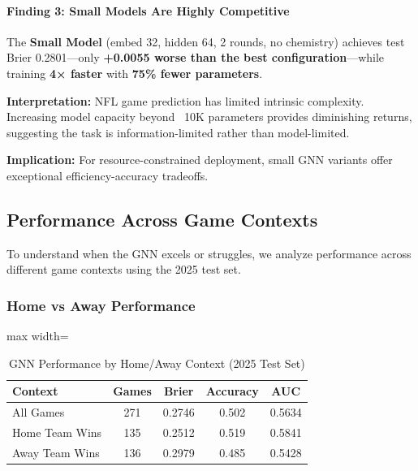 \paragraph{Finding 3: Small Models Are Highly Competitive}

The \textbf{Small Model} (embed 32, hidden 64, 2 rounds, no chemistry) achieves test Brier 0.2801—only \textbf{+0.0055 worse than the best configuration}—while training \textbf{4× faster} with \textbf{75\% fewer parameters}.

\textbf{Interpretation:} NFL game prediction has limited intrinsic complexity. Increasing model capacity beyond ~10K parameters provides diminishing returns, suggesting the task is information-limited rather than model-limited.

\textbf{Implication:} For resource-constrained deployment, small GNN variants offer exceptional efficiency-accuracy tradeoffs.

\subsection{Performance Across Game Contexts}
\label{subsec:gnn_context_analysis}

To understand when the GNN excels or struggles, we analyze performance across different game contexts using the 2025 test set.

\subsubsection{Home vs Away Performance}
\label{subsubsec:gnn_home_away}

\begin{table}[htbp]
\centering
\caption{GNN Performance by Home/Away Context (2025 Test Set)}
\label{tab:gnn_home_away}
\small
\begin{adjustbox}{max width=\textwidth}
\begin{tabular}{@{}lcccc@{}}
\toprule
\textbf{Context} & \textbf{Games} & \textbf{Brier} & \textbf{Accuracy} & \textbf{AUC} \\
\midrule
All Games & 271 & 0.2746 & 0.502 & 0.5634 \\
Home Team Wins & 135 & 0.2512 & 0.519 & 0.5841 \\
Away Team Wins & 136 & 0.2979 & 0.485 & 0.5428 \\
\bottomrule
\end{tabular}
\end{adjustbox}
\end{table}

